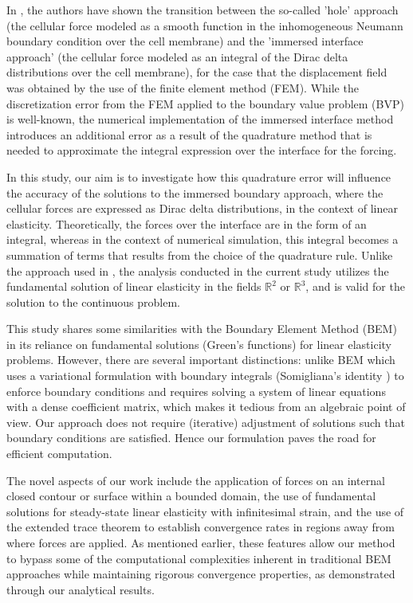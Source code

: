 \documentclass[pdflatex,sn-mathphys-num]{sn-jnl}
\newtheorem*{lemma star}{Lemma}
\begin{document}
In \citet{Peng_2022_JCAM}, the authors have shown the transition between the so-called 'hole' approach (the cellular force modeled as a smooth function in the inhomogeneous Neumann boundary condition over the cell membrane) and the 'immersed interface approach' (the cellular force modeled as an integral of the Dirac delta distributions over the cell membrane), for the case that the displacement field was obtained by the use of the finite element method (FEM). While the discretization error from the FEM applied to the boundary value problem (BVP) is well-known, the numerical implementation of the immersed interface method introduces an additional error as a result of the quadrature method that is needed to approximate the integral expression over the interface for the forcing.

In this study, our aim is to investigate how this quadrature error will influence the accuracy of the solutions to the immersed boundary approach, where the cellular forces are expressed as Dirac delta distributions, in the context of linear elasticity. Theoretically, the forces over the interface are in the form of an integral, whereas in the context of numerical simulation, this integral becomes a summation of terms that results from the choice of the quadrature rule. Unlike the approach used in \citet{Peng_2022_JCAM}, the analysis conducted in the current study utilizes the fundamental solution of linear elasticity in the fields $\mathbb{R}^2$ or $\mathbb{R}^3$, and is valid for the solution to the continuous problem. 

This study shares some similarities with the Boundary Element Method (BEM) \citep{Brebbia1992, Kythe1995, Alarcon1972} in its reliance on fundamental solutions (Green's functions) for linear elasticity problems. However, there are several important distinctions: unlike BEM which uses a variational formulation with boundary integrals (Somigliana's identity \citep{Friedel1981}) to enforce boundary conditions and requires solving a system of linear equations with a dense coefficient matrix, which makes it tedious from an algebraic point of view. Our approach does not require (iterative) adjustment of solutions such that boundary conditions are satisfied. Hence our formulation paves the road for efficient computation.

The novel aspects of our work include the application of forces on an internal closed contour or surface within a bounded domain, the use of fundamental solutions for steady-state linear elasticity with infinitesimal strain, and the use of the extended trace theorem to establish convergence rates in regions away from where forces are applied. As mentioned earlier, these features allow our method to bypass some of the computational complexities inherent in traditional BEM approaches \citep{Kythe1995, Alarcon1972} while maintaining rigorous convergence properties, as demonstrated through our analytical results.
\end{document}
